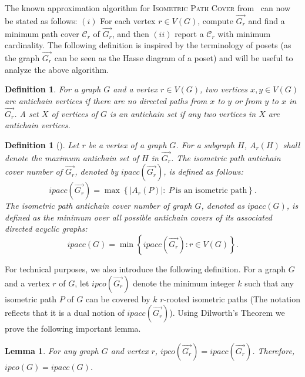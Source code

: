 \documentclass[a4paper]{article}
\newcommand{\IPC}{\textsc{Isometric Path Cover}\xspace}
\newcommand{\anticp}[2]{A_{#1}\left(#2\right)}
\newcommand{\ipcor}[2]{ipco\left(\overrightarrow{#2_{#1}}\right)}
\newcommand{\ipac}[1]{ipacc\left(#1\right)}
\newcommand{\ipco}[1]{ipco\left(#1\right)}
\newtheorem{lemma}[theorem]{Lemma}
\newtheorem{definition}[theorem]{Definition}
\begin{document}
{  The known approximation algorithm for \IPC from~\cite{ChakrabortyD0FG22} can now be stated as follows: $(i)$ For each vertex $r\in V(G)$, compute $\overrightarrow{G_r}$ and find a minimum path cover $\mathcal{C}_r$ of $\overrightarrow{G_r}$, and then $(ii)$ report a $\mathcal{C}_r$ with minimum cardinality. {The following definition is inspired by the terminology of posets (as the graph $\overrightarrow{G_r}$ can be seen as the Hasse diagram of a poset) and will be useful to analyze the above algorithm.}}

\begin{definition}\label{D:acSet}
\sloppy For a graph $G$ and a vertex $r\in V(G)$, two vertices $x,y\in V(G)$ are \emph{antichain vertices} if there are no directed paths from $x$ to $y$ or from $y$ to $x$ in $\overrightarrow{G_r}$. A set $X$ of vertices of $G$ is an \emph{antichain set} if any two vertices in $X$ are antichain vertices. 
\end{definition}


\begin{definition}[{\cite{ChakrabortyD0FG22}}]\label{D:acWidth}
Let $r$ be a vertex of a graph $G$. For a subgraph $H$, $\anticp{r}{H}$ shall denote the maximum antichain set of $H$ in $\overrightarrow{G_r}$. The \emph{isometric path antichain cover number} of $\overrightarrow{G_r}$, denoted by $\ipac{\overrightarrow{G_r}}$, is defined as follows: \[\ipac{\overrightarrow{G_r}}=\max\left\{|\anticp{r}{P}|\colon~P~\text{is an isometric path}\right\}.\]
The \emph{isometric path antichain cover number} of graph $G$, denoted as $\ipac{G}$, is defined as the minimum over all possible antichain covers of its associated directed acyclic graphs: \[\ipac{G}=\min \left\{\ipac{\overrightarrow{G_r}}\colon r\in V(G)\right\}.\]
\end{definition}

For technical purposes, we also introduce the following definition. For a graph $G$ and a vertex $r$ of $G$, let $\ipcor{r}{G}$ denote the minimum integer $k$ such that any isometric path $P$ of $G$ can be covered by $k$ $r$-rooted isometric paths (The notation reflects that it is a dual notion of $\ipac{\overrightarrow{G_r}}$). Using Dilworth's Theorem we prove the following important lemma.


\begin{lemma}\label{lem:ipac-ipco}
    For any graph $G$ and vertex $r$, $\ipcor{r}{G} = \ipac{\overrightarrow{G_r}}$. Therefore,  $\ipco{G}=\ipac{G}$.
\end{lemma}
\end{document}
